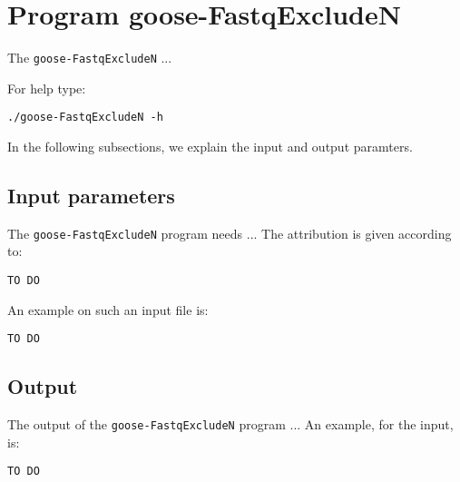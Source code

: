 \section{Program goose-FastqExcludeN}
The \texttt{goose-FastqExcludeN} ...

For help type:
\begin{lstlisting}
./goose-FastqExcludeN -h
\end{lstlisting}
In the following subsections, we explain the input and output paramters.

\subsection{Input parameters}

The \texttt{goose-FastqExcludeN} program needs ...
The attribution is given according to:
\begin{lstlisting}
TO DO
\end{lstlisting}

An example on such an input file is:
\begin{lstlisting}
TO DO
\end{lstlisting}

\subsection{Output}
The output of the \texttt{goose-FastqExcludeN} program ...
An example, for the input, is:
\begin{lstlisting}
TO DO
\end{lstlisting}
